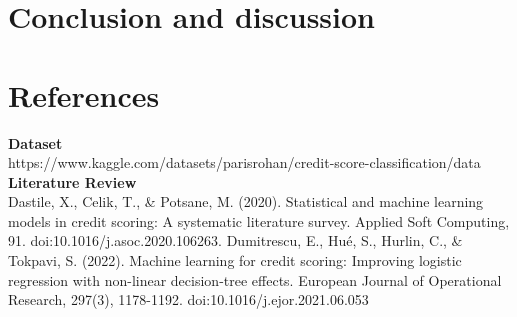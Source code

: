 \documentclass{article}
\begin{document}
\section*{Conclusion and discussion}

\newpage
\section*{References}
\textbf{Dataset}\\
https://www.kaggle.com/datasets/parisrohan/credit-score-classification/data
\vspace{5mm}\newline
\textbf{Literature Review}\\
Dastile, X., Celik, T., \& Potsane, M. (2020).
Statistical and machine learning models in credit scoring: A systematic literature survey.
Applied Soft Computing, 91. doi:10.1016/j.asoc.2020.106263.
\vspace{5mm}\newline
Dumitrescu, E., Hué, S., Hurlin, C., \& Tokpavi, S. (2022). 
Machine learning for credit scoring: Improving logistic regression 
with non-linear decision-tree effects. European Journal of Operational 
Research, 297(3), 1178-1192. doi:10.1016/j.ejor.2021.06.053
\end{document}
